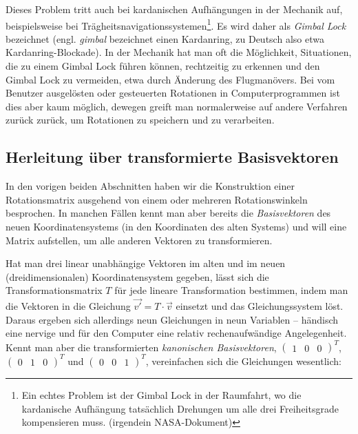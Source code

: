 Dieses Problem tritt auch bei kardanischen Aufhängungen in der Mechanik auf, beispielsweise bei Trägheitsnavigationssystemen\footnote{Ein echtes Problem ist der Gimbal Lock in der Raumfahrt, wo die kardanische Aufhängung tatsächlich Drehungen um alle drei Freiheitsgrade kompensieren muss. (\vgl irgendein NASA-Dokument)}. Es wird daher als \emph{Gimbal Lock} bezeichnet (engl. \emph{gimbal} bezeichnet einen Kardanring, zu Deutsch also etwa Kardanring-Blockade). In der Mechanik hat man oft die Möglichkeit, Situationen, die zu einem Gimbal Lock führen können, rechtzeitig zu erkennen und den Gimbal Lock zu vermeiden, etwa durch Änderung des Flugmanövers. Bei vom Benutzer ausgelösten oder gesteuerten Rotationen in Computerprogrammen ist dies aber kaum möglich, dewegen greift man normalerweise auf andere Verfahren zurück zurück, um Rotationen zu speichern und zu verarbeiten.

\subsection{Herleitung über transformierte Basisvektoren}
\label{rotationbasevectors}
In den vorigen beiden Abschnitten haben wir die Konstruktion einer Rotationsmatrix ausgehend von einem oder mehreren Rotationswinkeln besprochen. In manchen Fällen kennt man aber bereits die \emph{Basisvektoren} des neuen Koordinatensystems (in den Koordinaten des alten Systems) und will eine Matrix aufstellen, um alle anderen Vektoren zu transformieren.

Hat man drei linear unabhängige Vektoren im alten und im neuen (dreidimensionalen) Koordinatensystem gegeben, lässt sich die Transformationsmatrix $T$ für jede lineare Transformation bestimmen, indem man die Vektoren in die Gleichung $\vec{v'} = T \cdot \vec v$ einsetzt und das Gleichungssystem löst. Daraus ergeben sich allerdings neun Gleichungen in neun Variablen -- händisch eine nervige und für den Computer eine relativ rechenaufwändige Angelegenheit. Kennt man aber die transformierten \emph{kanonischen Basisvektoren}, $\begin{pmatrix} 1 & 0 & 0 \end{pmatrix}^T$, $\begin{pmatrix} 0 & 1 & 0 \end{pmatrix}^T$ und $\begin{pmatrix} 0 & 0 & 1 \end{pmatrix}^T$, vereinfachen sich die Gleichungen wesentlich:

